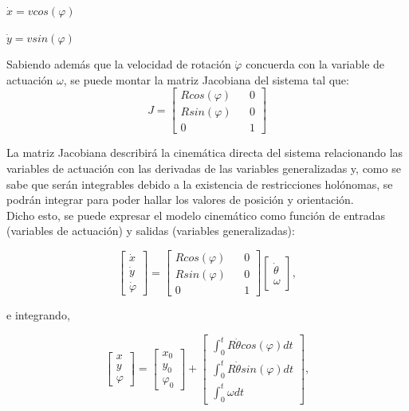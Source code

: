 \documentclass[a4paper,twoside]{article}
\begin{document}
	{\centering $\dot{x}=v cos(\varphi)$\par} {\centering $\dot{y}=v sin(\varphi)$\\}
	
		
	Sabiendo además que la velocidad de rotación $\dot{\varphi}$ concuerda con la variable de actuación $\omega$, se puede montar la matriz Jacobiana del sistema tal que:
		$$
		J=
		\begin{bmatrix}
			R cos(\varphi) && 0\\
			R sin(\varphi) && 0\\
			0 && 1
		\end{bmatrix}
		$$

	La matriz Jacobiana describirá la cinemática directa del sistema relacionando las variables de actuación con las derivadas de las variables generalizadas y, como se sabe que serán integrables debido a la existencia de restricciones holónomas, se podrán integrar para poder hallar los valores de posición y orientación.\\
	
	Dicho esto, se puede expresar el modelo cinemático como función de entradas (variables de actuación) y salidas (variables generalizadas):
	
		$$
		\begin{bmatrix}
		\dot{x}\\\dot{y}\\\dot{\varphi}
		\end{bmatrix}
		=
		\begin{bmatrix}
		R cos(\varphi) && 0\\
		R sin(\varphi) && 0\\
		0 && 1
		\end{bmatrix}
		\begin{bmatrix}
		\dot{\theta}\\\omega
		\end{bmatrix},
		$$

	e integrando,
	
		$$
		\begin{bmatrix}
		x\\y\\\varphi
		\end{bmatrix}
		=
		\begin{bmatrix}
		x_0\\y_0\\\varphi_0
		\end{bmatrix}
		+
		\begin{bmatrix}
		\int_{0}^{t} R\dot{\theta}cos(\varphi)dt\\
		\int_{0}^{t} R\dot{\theta}sin(\varphi)dt\\
		\int_{0}^{t} \omega dt
		\end{bmatrix},
		$$
	
\end{document}
